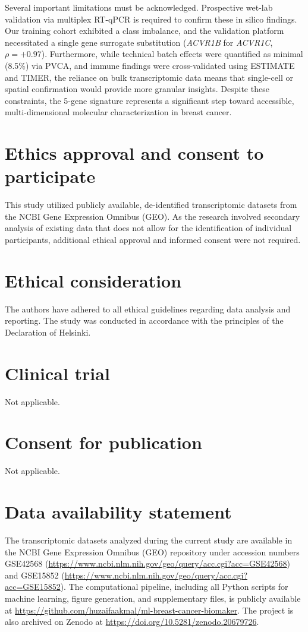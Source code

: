 \documentclass[a4paper,fleqn]{cas-dc}
\newcommand{\gene}[1]{\textit{#1}}
\begin{document}
Several important limitations must be acknowledged. Prospective wet-lab validation via multiplex RT-qPCR is required to confirm these in silico findings. Our training cohort exhibited a class imbalance, and the validation platform necessitated a single gene surrogate substitution (\gene{ACVR1B} for \gene{ACVR1C}, $\rho=+0.97$). Furthermore, while technical batch effects were quantified as minimal (8.5\%) via PVCA, and immune findings were cross-validated using ESTIMATE and TIMER, the reliance on bulk transcriptomic data means that single-cell or spatial confirmation would provide more granular insights. Despite these constraints, the 5-gene signature represents a significant step toward accessible, multi-dimensional molecular characterization in breast cancer.

\section*{Ethics approval and consent to participate}
This study utilized publicly available, de-identified transcriptomic datasets from the NCBI Gene Expression Omnibus (GEO). As the research involved secondary analysis of existing data that does not allow for the identification of individual participants, additional ethical approval and informed consent were not required.

\section*{Ethical consideration}
The authors have adhered to all ethical guidelines regarding data analysis and reporting. The study was conducted in accordance with the principles of the Declaration of Helsinki.

\section*{Clinical trial}
Not applicable.

\section*{Consent for publication}
Not applicable.

\section*{Data availability statement}
The transcriptomic datasets analyzed during the current study are available in the NCBI Gene Expression Omnibus (GEO) repository under accession numbers GSE42568 (\url{https://www.ncbi.nlm.nih.gov/geo/query/acc.cgi?acc=GSE42568}) and GSE15852 (\url{https://www.ncbi.nlm.nih.gov/geo/query/acc.cgi?acc=GSE15852}). The computational pipeline, including all Python scripts for machine learning, figure generation, and supplementary files, is publicly available at \url{https://github.com/huzaifaakmal/ml-breast-cancer-biomaker}. The project is also archived on Zenodo at \url{https://doi.org/10.5281/zenodo.20679726}.
\end{document}
